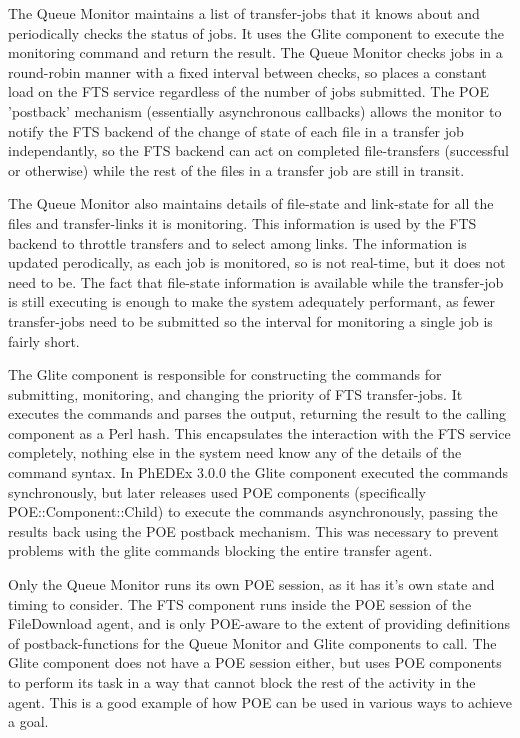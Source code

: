 \documentclass{PoS}
\begin{document}
The Queue Monitor maintains a list of transfer-jobs that it knows
about and periodically checks the status of jobs. It uses the Glite
component to execute the monitoring command and return the result. The
Queue Monitor checks jobs in a round-robin manner with a fixed
interval between checks, so places a constant load on the FTS service
regardless of the number of jobs submitted. The POE 'postback'
mechanism (essentially asynchronous callbacks) allows the monitor to
notify the FTS backend of the change of state of each file in a
transfer job independantly, so the FTS backend can act on completed
file-transfers (successful or otherwise) while the rest of the files
in a transfer job are still in transit.

The Queue Monitor also maintains details of file-state and link-state
for all the files and transfer-links it is monitoring. This
information is used by the FTS backend to throttle transfers and to
select among links. The information is updated perodically, as each
job is monitored, so is not real-time, but it does not need to be. The
fact that file-state information is available while the transfer-job
is still executing is enough to make the system adequately performant,
as fewer transfer-jobs need to be submitted so the interval for
monitoring a single job is fairly short.

The Glite component is responsible for constructing the commands for
submitting, monitoring, and changing the priority of FTS
transfer-jobs. It executes the commands and parses the output,
returning the result to the calling component as a Perl hash. This
encapsulates the interaction with the FTS service completely, nothing
else in the system need know any of the details of the command
syntax. In PhEDEx 3.0.0 the Glite component executed the commands
synchronously, but later releases used POE components (specifically
POE::Component::Child) to execute the commands asynchronously, passing
the results back using the POE postback mechanism. This was necessary
to prevent problems with the glite commands blocking the entire
transfer agent.

Only the Queue Monitor runs its own POE session, as it has it's own
state and timing to consider. The FTS component runs inside the POE
session of the FileDownload agent, and is only POE-aware to the extent
of providing definitions of postback-functions for the Queue Monitor
and Glite components to call. The Glite component does not have a POE
session either, but uses POE components to perform its task in a way
that cannot block the rest of the activity in the agent. This is a
good example of how POE can be used in various ways to achieve a goal.
\end{document}
